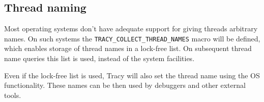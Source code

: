 \documentclass[hidelinks,titlepage,a4paper]{article}
\begin{document}
\subsection{Thread naming}

Most operating systems don't have adequate support for giving threads arbitrary names. On such systems the \texttt{TRACY\_COLLECT\_THREAD\_NAMES} macro will be defined, which enables storage of thread names in a lock-free list. On subsequent thread name queries this list is used, instead of the system facilities.

Even if the lock-free list is used, Tracy will also set the thread name using the OS functionality. These names can be then used by debuggers and other external tools.
\end{document}
